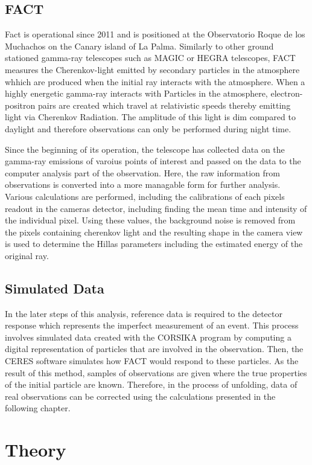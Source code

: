 \subsection{FACT}
Fact is operational since 2011 and is positioned at the Observatorio Roque de los Muchachos on the Canary island of La Palma.    
Similarly to other ground stationed gamma-ray telescopes such as MAGIC or HEGRA telescopes, FACT measures the Cherenkov-light emitted by secondary particles in the atmosphere whhich are produced when the initial ray interacts with the atmosphere.
When a highly energetic gamma-ray interacts with Particles in the atmosphere, electron-positron pairs are created which travel at relativistic speeds thereby emitting light via Cherenkov Radiation.
The amplitude of this light is dim compared to daylight and therefore observations can only be performed during night time.

Since the beginning of its operation, the telescope has collected data on the gamma-ray emissions of varoius points of interest and passed on the data to the computer analysis part of the observation.
Here, the raw information from observations is converted into a more managable form for further analysis.
Various calculations are performed, including the calibrations of each pixels readout in the cameras detector, including finding the mean time and intensity of the individual pixel.
Using these values, the background noise is removed from the pixels containing cherenkov light and the resulting shape in the camera view is used to determine the Hillas parameters including the estimated energy of the original ray.

\subsection{Simulated Data}
In the later steps of this analysis, reference data is required to the detector response which represents the imperfect measurement of an event.
This process involves simulated data created with the CORSIKA program \cite{corsika} by computing a digital representation of particles that are involved in the observation.
Then, the CERES software simulates how FACT would respond to these particles.
As the result of this method, samples of observations are given where the true properties of the initial particle are known.
Therefore, in the process of unfolding, data of real observations can be corrected using the calculations presented in the following chapter. 
    \section{Theory}

